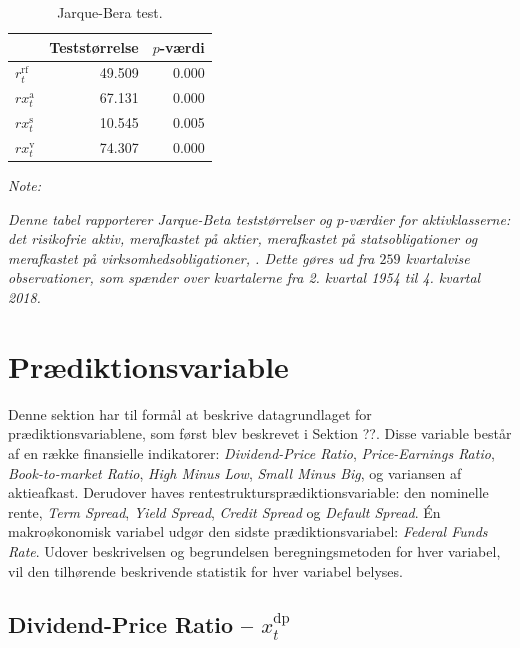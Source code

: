 \documentclass[
  a4paper,
  oneside]{memoir}
\begin{document}
\begin{landscape}
\begin{table}[!h]
\caption{\label{tab:JB-AKTIVKLASSE}Jarque-Bera test.}
\centering
\begin{threeparttable}
\begin{tabular}[t]{lrr}
\toprule
  & Teststørrelse & $p$-værdi\\
\midrule
\rowcolor{gray!6}  $r_t^{\text{rf}}$ & 49.509 & 0.000\\
$rx_t^{\text{a}}$ & 67.131 & 0.000\\
\rowcolor{gray!6}  $rx_t^{\text{s}}$ & 10.545 & 0.005\\
$rx_t^{\text{v}}$ & 74.307 & 0.000\\
\bottomrule
\end{tabular}
\begin{tablenotes}
\item \textit{Note: } 
\item \textit{Denne tabel rapporterer Jarque-Beta teststørrelser og $p$-værdier for aktivklasserne: det risikofrie aktiv, merafkastet på aktier, merafkastet på statsobligationer og merafkastet på virksomhedsobligationer, \citep{Jarque1980}. Dette gøres ud fra $259$ kvartalvise observationer, som spænder over kvartalerne fra 2. kvartal 1954 til 4. kvartal 2018.}
\end{tablenotes}
\end{threeparttable}
\end{table}
\end{landscape}

\hypertarget{pvariable}{%
\section{Prædiktionsvariable}\label{pvariable}}

Denne sektion har til formål at beskrive datagrundlaget for prædiktionsvariablene, som først blev beskrevet i Sektion ??. Disse variable består af en række finansielle indikatorer: \emph{Dividend-Price Ratio}, \emph{Price-Earnings Ratio}, \emph{Book-to-market Ratio}, \emph{High Minus Low}, \emph{Small Minus Big}, og variansen af aktieafkast. Derudover haves rentestruktursprædiktionsvariable: den nominelle rente, \emph{Term Spread}, \emph{Yield Spread}, \emph{Credit Spread} og \emph{Default Spread}. Én makroøkonomisk variabel udgør den sidste prædiktionsvariabel: \emph{Federal Funds Rate}. Udover beskrivelsen og begrundelsen beregningsmetoden for hver variabel, vil den tilhørende beskrivende statistik for hver variabel belyses.

\hypertarget{dividend-price-ratio-x_ttextdp}{%
\subsection{\texorpdfstring{Dividend-Price Ratio -- \(x_t^{\text{dp}}\)}{Dividend-Price Ratio -- x\_t\^{}\{\textbackslash text\{dp\}\}}}\label{dividend-price-ratio-x_ttextdp}}
\end{document}
